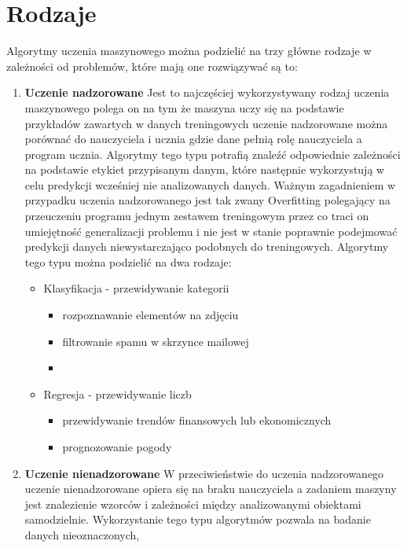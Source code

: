 \section{Rodzaje}
Algorytmy uczenia maszynowego można podzielić na trzy główne rodzaje w zależności od problemów, które mają one rozwiązywać są to:
\begin{enumerate}
    \item \textbf{Uczenie nadzorowane}
    Jest to najczęściej wykorzystywany rodzaj uczenia maszynowego polega on na tym 
    że maszyna uczy się na podstawie przykładów zawartych w danych treningowych 
    uczenie nadzorowane można porównać do nauczyciela i ucznia gdzie dane pełnią rolę nauczyciela 
    a program ucznia. Algorytmy tego typu potrafią znaleźć odpowiednie zależności na podstawie
    etykiet przypisanym danym,
    które następnie wykorzystują w celu predykcji wcześniej nie analizowanych danych.
    Ważnym zagadnieniem w przypadku uczenia nadzorowanego jest tak zwany Overfitting polegający 
    na przeuczeniu programu jednym zestawem treningowym przez co traci on umiejętność generalizacji problemu
    i nie jest w stanie poprawnie podejmować predykcji danych niewystarczająco podobnych
    do treningowych. Algorytmy tego typu można podzielić na dwa rodzaje:
    \begin{itemize}
        \item Klasyfikacja - przewidywanie kategorii
        \begin{itemize}
            \item rozpoznawanie elementów na zdjęciu
            \item filtrowanie spamu w skrzynce mailowej
            \item 
        \end{itemize}
        \item Regresja - przewidywanie liczb
        \begin{itemize}
            \item przewidywanie trendów finansowych lub ekonomicznych
            \item prognozowanie pogody
        \end{itemize}
    \end{itemize}
    \item \textbf{Uczenie nienadzorowane}
    W przeciwieństwie do uczenia nadzorowanego uczenie nienadzorowane opiera się na braku
    nauczyciela a zadaniem maszyny jest znalezienie wzorców i zależności między analizowanymi
    obiektami samodzielnie. Wykorzystanie tego typu algorytmów pozwala na badanie danych nieoznaczonych,

\end{enumerate}
